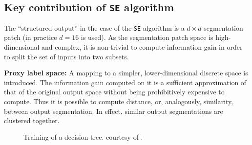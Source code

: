 \subsection{Key contribution of {\tt SE} algorithm}
The ``structured output'' in the case of the {\tt SE} algorithm is a $d\times d$ segmentation patch (in practice %
$d = 16$ is used). 
As the segmentation patch space is high-dimensional and complex, it is non-trivial to compute information gain in order to split the set of inputs into two subsets.

\textbf{Proxy label space:} A mapping to a simpler, lower-dimensional discrete space is introduced. The information gain computed on it is a sufficient approximation of that of the original output space without being prohibitively expensive to compute. Thus it is possible to compute distance, or, analogously, similarity, between output segmentation. In effect, similar output segmentations are clustered together.

\begin{figure}[t]
\centering
\caption[Training of a structured decision tree]{Training of a decision tree. \protect{} courtesy of \cite{DollarICCV13PresentationSlides}.}
\label{fig:srf-training}
\end{figure}

